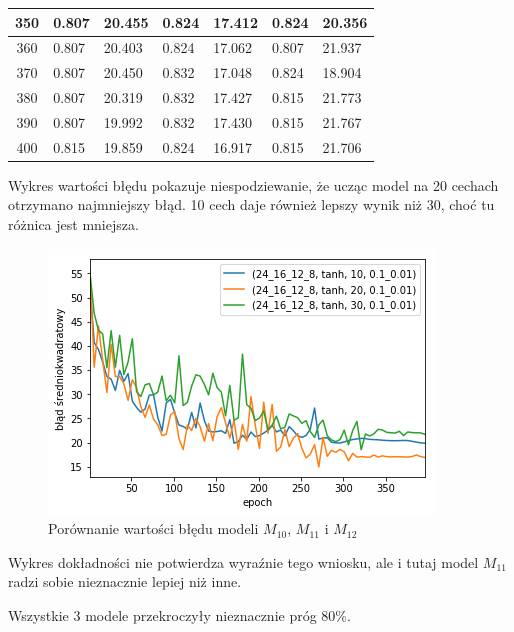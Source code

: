 \begin{longtable}{|c|l|l|l|l|l|l|}
        350 & 0.807 & 20.455 & 0.824 & 17.412 & 0.824 & 20.356 \\ \hline
        360 & 0.807 & 20.403 & 0.824 & 17.062 & 0.807 & 21.937 \\ \hline
        370 & 0.807 & 20.450 & 0.832 & 17.048 & 0.824 & 18.904 \\ \hline
        380 & 0.807 & 20.319 & 0.832 & 17.427 & 0.815 & 21.773 \\ \hline
        390 & 0.807 & 19.992 & 0.832 & 17.430 & 0.815 & 21.767 \\ \hline
        400 & 0.815 & 19.859 & 0.824 & 16.917 & 0.815 & 21.706 \\ \hline
    \end{longtable}

    Wykres wartości błędu pokazuje niespodziewanie, że ucząc model na 20 cechach otrzymano najmniejszy błąd.
    10 cech daje również lepszy wynik niż 30, choć tu różnica jest mniejsza.

    \begin{figure}[htp]
        \centering
        \includegraphics[scale=0.8]{./img/feat-error-tanh.png}
        \caption{Porównanie wartości błędu modeli $M_{10}$, $M_{11}$ i $M_{12}$}
    \end{figure}

    Wykres dokładności nie potwierdza wyraźnie tego wniosku, ale i tutaj model $M_{11}$ radzi sobie nieznacznie lepiej niż inne.

    Wszystkie 3 modele przekroczyły nieznacznie próg 80\%.

